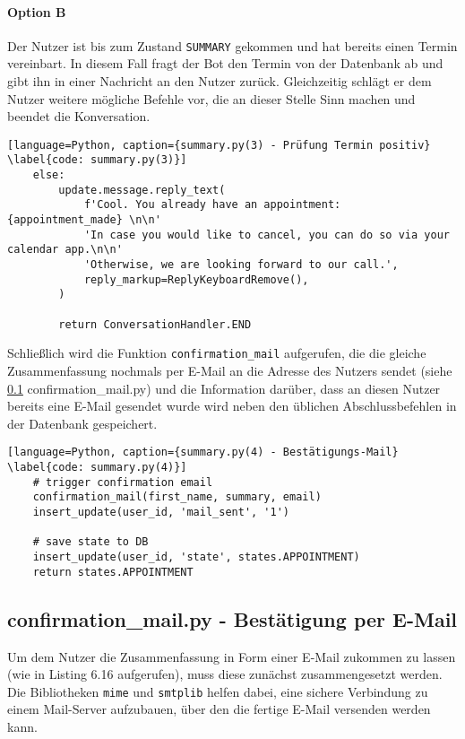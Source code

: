             \paragraph{Option B}
            Der Nutzer ist bis zum Zustand \verb|SUMMARY| gekommen und hat bereits einen Termin vereinbart. In diesem Fall fragt der Bot den Termin von der Datenbank ab und gibt ihn in einer Nachricht an den Nutzer zurück. Gleichzeitig schlägt er dem Nutzer weitere mögliche Befehle vor, die an dieser Stelle Sinn machen und beendet die Konversation.            
            
            \begin{lstlisting}[language=Python, caption={summary.py(3) - Prüfung Termin positiv} \label{code: summary.py(3)}]
    else:
        update.message.reply_text(
            f'Cool. You already have an appointment: {appointment_made} \n\n'
            'In case you would like to cancel, you can do so via your calendar app.\n\n'
            'Otherwise, we are looking forward to our call.',
            reply_markup=ReplyKeyboardRemove(),
        )

        return ConversationHandler.END
            \end{lstlisting}

        Schließlich wird die Funktion \verb|confirmation_mail| aufgerufen, die die gleiche Zusammenfassung nochmals per E-Mail an die Adresse des Nutzers sendet (siehe \ref{Implementierung: confirmation_mail.py} confirmation\_mail.py) und die Information darüber, dass an diesen Nutzer bereits eine E-Mail gesendet wurde wird neben den üblichen Abschlussbefehlen in der Datenbank gespeichert.
            
            \begin{lstlisting}[language=Python, caption={summary.py(4) - Bestätigungs-Mail} \label{code: summary.py(4)}]
    # trigger confirmation email
    confirmation_mail(first_name, summary, email)
    insert_update(user_id, 'mail_sent', '1')

    # save state to DB
    insert_update(user_id, 'state', states.APPOINTMENT)
    return states.APPOINTMENT
            \end{lstlisting}

                    
        \subsection{confirmation\_mail.py - Bestätigung per E-Mail} \label{Implementierung: confirmation_mail.py}
            Um dem Nutzer die Zusammenfassung in Form einer E-Mail zukommen zu lassen (wie in Listing 6.16 aufgerufen), muss diese zunächst zusammengesetzt werden. Die Bibliotheken \verb|mime| \cite{email.mime} und \verb|smtplib| \cite{smtplib} helfen dabei, eine sichere Verbindung zu einem Mail-Server aufzubauen, über den die fertige E-Mail versenden werden kann.\\

